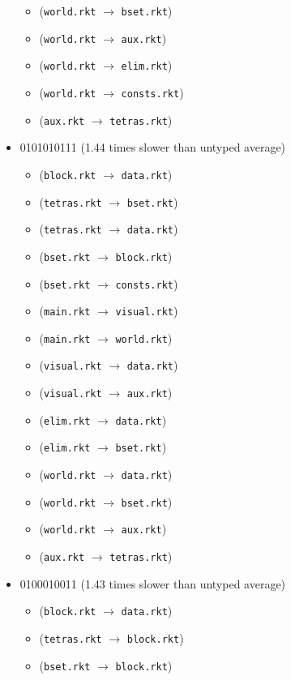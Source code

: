 \documentclass{article}
\newcommand{\mono}[1]{\texttt{#1}}
\begin{document}
\begin{itemize}
\begin{itemize}
  \item (\mono{world.rkt} $\rightarrow$ \mono{bset.rkt})
  \item (\mono{world.rkt} $\rightarrow$ \mono{aux.rkt})
  \item (\mono{world.rkt} $\rightarrow$ \mono{elim.rkt})
  \item (\mono{world.rkt} $\rightarrow$ \mono{consts.rkt})
  \item (\mono{aux.rkt} $\rightarrow$ \mono{tetras.rkt})
  \end{itemize}
\item 0101010111 (1.44 times slower than untyped average)
  \begin{itemize}
  \item (\mono{block.rkt} $\rightarrow$ \mono{data.rkt})
  \item (\mono{tetras.rkt} $\rightarrow$ \mono{bset.rkt})
  \item (\mono{tetras.rkt} $\rightarrow$ \mono{data.rkt})
  \item (\mono{bset.rkt} $\rightarrow$ \mono{block.rkt})
  \item (\mono{bset.rkt} $\rightarrow$ \mono{consts.rkt})
  \item (\mono{main.rkt} $\rightarrow$ \mono{visual.rkt})
  \item (\mono{main.rkt} $\rightarrow$ \mono{world.rkt})
  \item (\mono{visual.rkt} $\rightarrow$ \mono{data.rkt})
  \item (\mono{visual.rkt} $\rightarrow$ \mono{aux.rkt})
  \item (\mono{elim.rkt} $\rightarrow$ \mono{data.rkt})
  \item (\mono{elim.rkt} $\rightarrow$ \mono{bset.rkt})
  \item (\mono{world.rkt} $\rightarrow$ \mono{data.rkt})
  \item (\mono{world.rkt} $\rightarrow$ \mono{bset.rkt})
  \item (\mono{world.rkt} $\rightarrow$ \mono{aux.rkt})
  \item (\mono{aux.rkt} $\rightarrow$ \mono{tetras.rkt})
  \end{itemize}
\item 0100010011 (1.43 times slower than untyped average)
  \begin{itemize}
  \item (\mono{block.rkt} $\rightarrow$ \mono{data.rkt})
  \item (\mono{tetras.rkt} $\rightarrow$ \mono{block.rkt})
  \item (\mono{bset.rkt} $\rightarrow$ \mono{block.rkt})

\end{itemize}
\end{itemize}
\end{document}
